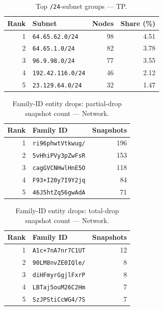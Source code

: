 \documentclass[conference]{IEEEtran}
\begin{document}
\begin{table}[H]
\caption{Top \texttt{/24}-subnet groups --- TP.}
\begin{center}\small
\begin{tabular}{|r|l|r|r|}
\hline
\textbf{Rank} & \textbf{Subnet} & \textbf{Nodes} & \textbf{Share (\%)} \\ \hline
1 & \texttt{64.65.62.0/24} & 98 & 4.51 \\ \hline
2 & \texttt{64.65.1.0/24} & 82 & 3.78 \\ \hline
3 & \texttt{96.9.98.0/24} & 77 & 3.55 \\ \hline
4 & \texttt{192.42.116.0/24} & 46 & 2.12 \\ \hline
5 & \texttt{23.129.64.0/24} & 32 & 1.47 \\ \hline
\end{tabular}
\label{tab:subnet_count_third_party_probe}
\end{center}\end{table}
 
\begin{table}[H]
\caption{Family-ID entity drops: partial-drop snapshot count --- Network.}
\begin{center}\small
\begin{tabular}{|r|l|r|}
\hline
\textbf{Rank} & \textbf{Family ID} & \textbf{Snapshots} \\ \hline
1 & \texttt{ri96phwtVtkwug/} & 196 \\ \hline
2 & \texttt{5vHhiPVy3pZwFsR} & 153 \\ \hline
3 & \texttt{cagGVCNHwlHnE5O} & 118 \\ \hline
4 & \texttt{F93+I20y7I9Y2jq} & 84 \\ \hline
5 & \texttt{46J5htZq56gwAdA} & 71 \\ \hline
\end{tabular}
\label{tab:famdrop_partial_network}
\end{center}\end{table}
 
\begin{table}[H]
\caption{Family-ID entity drops: total-drop snapshot count --- Network.}
\begin{center}\small
\begin{tabular}{|r|l|r|}
\hline
\textbf{Rank} & \textbf{Family ID} & \textbf{Snapshots} \\ \hline
1 & \texttt{A1c+7nA7nr7C1UT} & 12 \\ \hline
2 & \texttt{90LM8nvZE0IQle/} & 8 \\ \hline
3 & \texttt{diHFmyrGgjlFxrP} & 8 \\ \hline
4 & \texttt{LBTaj5ouM26C2Hm} & 7 \\ \hline
5 & \texttt{SzJPStiCcWG4/7S} & 7 \\ \hline
\end{tabular}
\label{tab:famdrop_total_network}
\end{center}\end{table}
 
\end{document}
